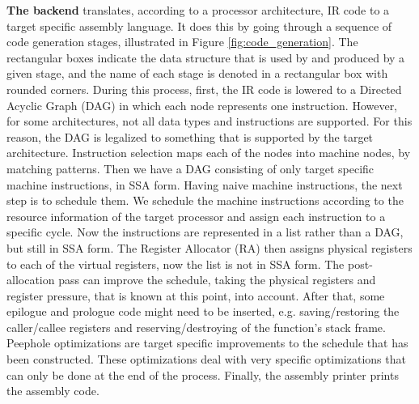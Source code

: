 \textbf{The backend} translates, according to a processor architecture, IR code to a target specific assembly language. It does this by going through a sequence of code generation stages, illustrated in Figure \ref{fig:code_generation}. The rectangular boxes indicate the data structure that is used by and produced by a given stage, and the name of each stage is denoted in a rectangular box with rounded corners. During this process, first, the IR code is lowered to a Directed Acyclic Graph (DAG) in which each node represents one instruction. However, for some architectures, not all data types and instructions are supported. For this reason, the DAG is legalized to something that is supported by the target architecture. Instruction selection maps each of the nodes into machine nodes, by matching patterns. %
Then we have a DAG consisting of only target specific machine instructions, in SSA form. Having naive machine instructions, the next step is to schedule them. We schedule the machine instructions according to the resource information of the target processor and assign each instruction to a specific cycle. 
Now the instructions are represented in a list rather than a DAG, but still in SSA form. The Register Allocator (RA) then assigns physical registers to each of the virtual registers, now the list is not in SSA form. 
The post-allocation pass can improve the schedule, taking the physical registers and register pressure, that is known at this point, into account. After that, some epilogue and prologue code might need to be inserted, e.g. saving/restoring the caller/callee registers and reserving/destroying of the function's stack frame. Peephole optimizations are target specific improvements to the schedule that has been constructed. These optimizations deal with very specific optimizations that can only be done at the end of the process. Finally, the assembly printer prints the assembly code.






